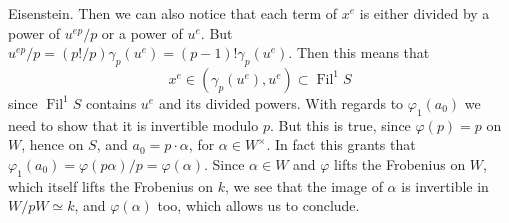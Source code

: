 \begin{rem}[]
	Eisenstein.
	Then we can also notice that each term of $x^e$ is either divided by
	a power of $u^{ep}/p$ or a power of $u^e$.
	But $u^{ep}/p = (p!/p) \gamma_p(u^e) = (p-1)! \gamma_p(u^e)$.
	Then this means that
	\begin{equation*}
		x^e \in \left( \gamma_p(u^e), u^e \right) \subset \operatorname{Fil}^1S
	\end{equation*}
	since $\operatorname{Fil}^1S$ contains $u^e$ and its divided powers.
	With regards to $\varphi_1(a_0)$ we need to show that it 
	is invertible modulo $p$.
	But this is true, since $\varphi(p) = p$ on $W$, hence on $S$,
	and $a_0 = p \cdot \alpha$, for $\alpha \in W^{\times}$.
	In fact this grants that $\varphi_1(a_0) = \varphi(p \alpha)/p = \varphi(\alpha)$.
	Since $\alpha \in W$ and $\varphi$ lifts the Frobenius on $W$,
	which itself lifts the Frobenius on $k$, we see that the image
	of $\alpha$ is invertible in $W/pW \simeq k$, and $\varphi(\alpha)$ too,
	which allows us to conclude.
\end{rem}


